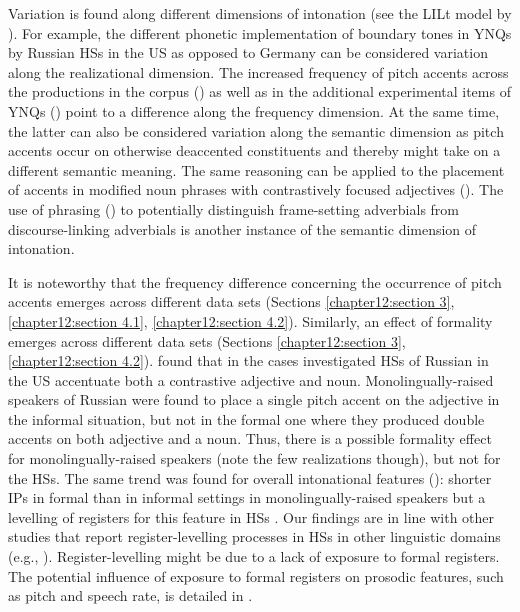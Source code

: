 \documentclass[output=paper,colorlinks,citecolor=brown]{langscibook}
\begin{document}
Variation is found along different dimensions of intonation (see the LILt model by \cite{Mennen_2015}). For example, the different phonetic implementation of boundary tones in YNQs by Russian HSs in the US as opposed to Germany can be considered variation along the realizational dimension. The increased frequency of pitch accents across the productions in the corpus () as well as in the additional experimental items of YNQs () point to a difference along the frequency dimension. At the same time, the latter can also be considered variation along the semantic dimension as pitch accents occur on otherwise deaccented constituents and thereby might take on a different semantic meaning. The same reasoning can be applied to the placement of accents in modified noun phrases with contrastively focused adjectives (). The use of phrasing () to potentially distinguish frame-setting adverbials from discourse-linking adverbials is another instance of the semantic dimension of intonation.

It is noteworthy that the frequency difference concerning the occurrence of pitch accents emerges across different data sets (Sections \ref{chapter12:section 3}, \ref{chapter12:section 4.1}, \ref{chapter12:section 4.2}). Similarly, an effect of formality emerges across different data sets (Sections \ref{chapter12:section 3}, \ref{chapter12:section 4.2}). \citet{Zerbian_Böttcher_Zuban_2022} found that in the cases investigated HSs of Russian in the US accentuate both a contrastive adjective and noun. Monolingually-raised speakers of Russian were found to place a single pitch accent on the adjective in the informal situation, but not in the formal one where they produced double accents on both adjective and a noun. Thus, there is a possible formality effect for monolingually-raised speakers (note the few realizations though), but not for the HSs. The same trend was found for overall intonational features (): shorter IPs in formal than in informal settings in monolingually-raised speakers but a levelling of registers for this feature in HSs \citep{Zerbian_Zuban_Klotz_2024}. Our findings are in line with other studies that report register-levelling processes in HSs in other linguistic domains (e.g., \cite{Colantoni_Cuza_Mazzaro_2016, Alexiadou_Rizou_Karkaletsou_2022, Schroeder_etal_forth}). Register-levelling might be due to a lack of exposure to formal registers. The potential influence of exposure to formal registers on prosodic features, such as pitch and speech rate, is detailed in \citet{Rao_etal_2020}.
\end{document}
